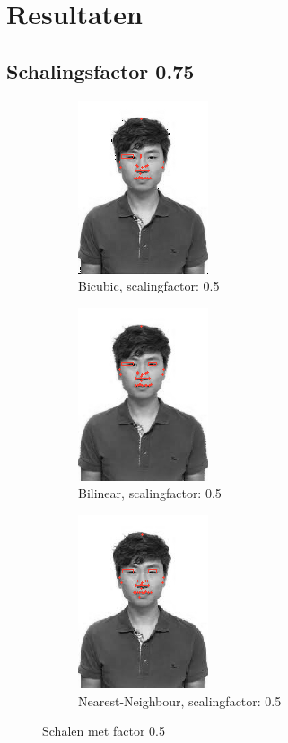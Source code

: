 \documentclass{article}
\begin{document}
\section{Resultaten}

\subsection{Schalingsfactor 0.75}

\begin{figure}[H]
\centering
    \begin{subfigure}{.5\textwidth}
      \centering
      \includegraphics[]{assets/Bicubic_male_075.png}
      \caption{Bicubic, scalingfactor: 0.5}
      \label{fig:sub1}
    \end{subfigure}%
    \begin{subfigure}{.5\textwidth}
      \centering
      \includegraphics[]{assets/Bilinear_male_075.png}
      \caption{Bilinear, scalingfactor: 0.5}
      \label{fig:sub2}
    \end{subfigure}
    \begin{subfigure}{.5\textwidth}
      \centering
      \includegraphics[]{assets/Nearest-neighbor_male_075.png}
      \caption{Nearest-Neighbour, scalingfactor: 0.5}
      \label{fig:sub3}
    \end{subfigure}
    \caption{Schalen met factor 0.5}
    \label{fig:test}
\end{figure}
\end{document}

